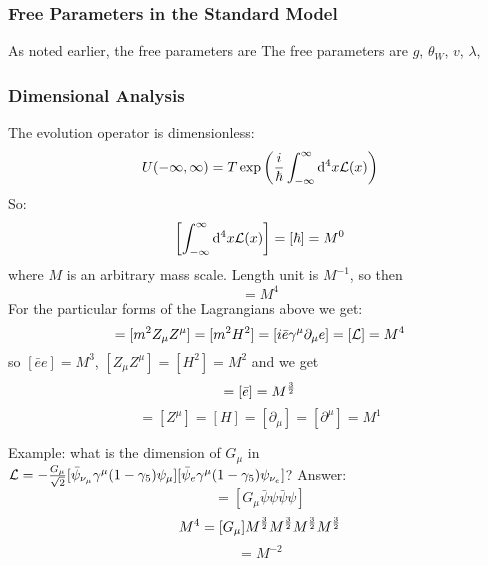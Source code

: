 \subsubsection{Free Parameters in the Standard Model}

As noted earlier, the free parameters are The free parameters are $g$, $\theta_W$, $v$, $\lambda$,

\subsubsection{Dimensional Analysis}

The evolution operator is dimensionless: 
\begin{equation*}
  U(-\infty,\infty) = T\exp\left({i\over\hbar}\int_{-\infty}^{\infty}{\rm d}^4 x {\mathcal L}(x) \right)
\end{equation*}
So: 
\begin{equation*}
  \left[\int_{-\infty}^{\infty}{\rm d}^4 x {\mathcal L}(x) \right] = [\hbar] = M^0
\end{equation*}
where $M$ is an arbitrary mass scale. Length unit is $M^{-1}$, so then 
\begin{equation*}
  [\L(x)] = M^4
\end{equation*}
For the particular forms of the Lagrangians above we get: 
\begin{equation*}
  [m\bar ee] = [m^2 Z_\mu Z^\mu] = [m^2 H^2] = [i\bar e\gamma^\mu\partial_\mu e] = [\L] = M^4
\end{equation*}
so $[\bar ee] = M^3$, $[Z_\mu Z^\mu]=[H^2] = M^2$ and we get 
\begin{equation*}
  [e] = [\bar e] = M^{3\over2}
\end{equation*}
\begin{equation*}
  [Z_\mu] = [Z^\mu] = [H] = [\partial_\mu] = [\partial^\mu] = M^1
\end{equation*}

Example: what is the dimension of $G_\mu$ in ${\mathcal L} = -{G_\mu\over\sqrt2} [\bar \psi_{\nu_\mu}\gamma^\mu (1-\gamma_5) \psi_\mu] [\bar \psi_e\gamma^\mu (1-\gamma_5) \psi_{\nu_e}]$? Answer: 
\begin{equation*}
  [\L] = [G_\mu \bar\psi\psi\bar\psi\psi]
\end{equation*}
\begin{equation*}
  M^4 = [G_\mu] M^{3\over2}M^{3\over2}M^{3\over2}M^{3\over2}
\end{equation*}
\begin{equation*}
  [G_\mu] = M^{-2}
\end{equation*}

